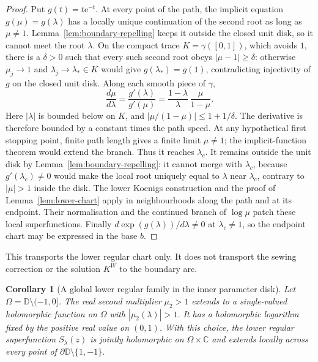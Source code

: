 \documentclass[11pt]{amsart}
\newtheorem{corollary}[theorem]{Corollary}
\theoremstyle{definition}
\newcommand{\Kk}{K}
\newcommand{\eee}{\mathrm{e}}
\begin{document}
\begin{proof}
Put $g(t)=t\eee^{-t}$.  At every point of the path, the implicit
equation $g(\mu)=g(\lambda)$ has a locally unique continuation of the
second root as long as $\mu\ne1$.  Lemma~\ref{lem:boundary-repelling}
keeps it outside the closed unit disk, so it cannot meet the root
$\lambda$.  On the compact trace $K=\gamma([0,1])$, which avoids $1$,
there is a $\delta>0$ such that every such second root obeys
$|\mu-1|\ge\delta$: otherwise $\mu_j\to1$ and
$\lambda_j\to\lambda_*\in K$ would give $g(\lambda_*)=g(1)$,
contradicting injectivity of $g$ on the closed unit disk.
Along each smooth piece of $\gamma$,
\[
 \frac{d\mu}{d\lambda}
 =\frac{g'(\lambda)}{g'(\mu)}
 =\frac{1-\lambda}{\lambda}\,\frac{\mu}{1-\mu}.
\]
Here $|\lambda|$ is bounded below on $K$, and
$|\mu/(1-\mu)|\le1+1/\delta$.  The derivative is therefore bounded
by a constant times the path speed.  At any hypothetical first stopping
point, finite path length gives a finite limit $\mu\ne1$; the
implicit-function theorem would extend the branch.  Thus it reaches
$\lambda_c$.  It remains outside the unit disk by
Lemma~\ref{lem:boundary-repelling}: it cannot merge with $\lambda_c$,
because $g'(\lambda_c)\ne0$ would make the local root uniquely equal to
$\lambda$ near $\lambda_c$, contrary to $|\mu|>1$ inside the disk.
The lower Koenigs construction and
the proof of Lemma~\ref{lem:lower-chart} apply in neighbourhoods along
the path and at its endpoint.  Their normalisation and the continued
branch of $\log\mu$ patch these local superfunctions.  Finally
$d\exp(g(\lambda))/d\lambda\ne0$ at $\lambda_c\ne1$, so the endpoint
chart may be expressed in the base $b$.
\end{proof}

This transports the lower regular chart only.  It does not transport
the sewing correction or the solution $\Kk^W$ to the boundary arc.

\begin{corollary}[A global lower regular family in the inner parameter disk]
\label{cor:global-lower}
Let $\Omega=\mathbb D\setminus(-1,0]$.  The real second multiplier
$\mu_2>1$ extends to a single-valued holomorphic function on $\Omega$
with $|\mu_2(\lambda)|>1$.  It has a holomorphic logarithm fixed by the
positive real value on $(0,1)$.  With this choice, the lower regular
superfunction $S_\lambda(z)$ is jointly holomorphic on
$\Omega\times\mathbb C$ and extends locally across every point of
$\partial\mathbb D\setminus\{1,-1\}$.
\end{corollary}
\end{document}
